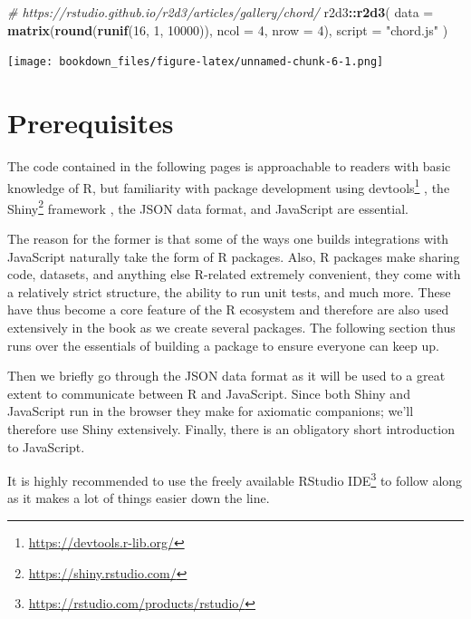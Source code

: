 \documentclass[
]{krantz}
\makeatletter
\newenvironment{Shaded}{\begin{snugshade}}{\end{snugshade}}
\newcommand{\CommentTok}[1]{\textcolor[rgb]{0.37,0.37,0.37}{\textit{#1}}}
\newcommand{\DataTypeTok}[1]{\textcolor[rgb]{0.27,0.27,0.27}{#1}}
\newcommand{\DecValTok}[1]{\textcolor[rgb]{0.06,0.06,0.06}{#1}}
\newcommand{\KeywordTok}[1]{\textcolor[rgb]{0.27,0.27,0.27}{\textbf{#1}}}
\newcommand{\NormalTok}[1]{#1}
\newcommand{\OperatorTok}[1]{\textcolor[rgb]{0.43,0.43,0.43}{\textbf{#1}}}
\newcommand{\StringTok}[1]{\textcolor[rgb]{0.5,0.5,0.5}{#1}}
\renewcommand{\href}[2]{#2\footnote{\url{#1}}}
\newenvironment{kframe}{%
\medskip{}
\setlength{\fboxsep}{.8em}
 \def\at@end@of@kframe{}%
 \ifinner\ifhmode%
  \def\at@end@of@kframe{\end{minipage}}%
  \begin{minipage}{\columnwidth}%
 \fi\fi%
 \def\FrameCommand##1{\hskip\@totalleftmargin \hskip-\fboxsep
 \colorbox{shadecolor}{##1}\hskip-\fboxsep
     \hskip-\linewidth \hskip-\@totalleftmargin \hskip\columnwidth}%
 \MakeFramed {\advance\hsize-\width
   \@totalleftmargin\z@ \linewidth\hsize
   \@setminipage}}%
 {\par\unskip\endMakeFramed%
 \at@end@of@kframe}
\renewenvironment{Shaded}{\begin{kframe}}{\end{kframe}}
\makeatother
\begin{document}
\begin{Shaded}
\begin{Highlighting}[]
\CommentTok{\# https://rstudio.github.io/r2d3/articles/gallery/chord/}
\NormalTok{r2d3}\OperatorTok{::}\KeywordTok{r2d3}\NormalTok{(}
  \DataTypeTok{data =} \KeywordTok{matrix}\NormalTok{(}\KeywordTok{round}\NormalTok{(}\KeywordTok{runif}\NormalTok{(}\DecValTok{16}\NormalTok{, }\DecValTok{1}\NormalTok{, }\DecValTok{10000}\NormalTok{)), }\DataTypeTok{ncol =} \DecValTok{4}\NormalTok{, }\DataTypeTok{nrow =} \DecValTok{4}\NormalTok{), }
  \DataTypeTok{script =} \StringTok{"chord.js"}
\NormalTok{)}
\end{Highlighting}
\end{Shaded}

\texttt{[image: bookdown\_files/figure-latex/unnamed-chunk-6-1.png]}

\hypertarget{prerequisites}{%
\chapter{Prerequisites}\label{prerequisites}}

The code contained in the following pages is approachable to readers with basic knowledge of R, but familiarity with package development using \href{https://devtools.r-lib.org/}{devtools} \citep{R-devtools}, the \href{https://shiny.rstudio.com/}{Shiny} framework \citep{R-shiny}, the JSON data format, and JavaScript are essential.

The reason for the former is that some of the ways one builds integrations with JavaScript naturally take the form of R packages. Also, R packages make sharing code, datasets, and anything else R-related extremely convenient, they come with a relatively strict structure, the ability to run unit tests, and much more. These have thus become a core feature of the R ecosystem and therefore are also used extensively in the book as we create several packages. The following section thus runs over the essentials of building a package to ensure everyone can keep up.

Then we briefly go through the JSON data format as it will be used to a great extent to communicate between R and JavaScript. Since both Shiny and JavaScript run in the browser they make for axiomatic companions; we'll therefore use Shiny extensively. Finally, there is an obligatory short introduction to JavaScript.

It is highly recommended to use the freely available \href{https://rstudio.com/products/rstudio/}{RStudio IDE} to follow along as it makes a lot of things easier down the line.
\end{document}
